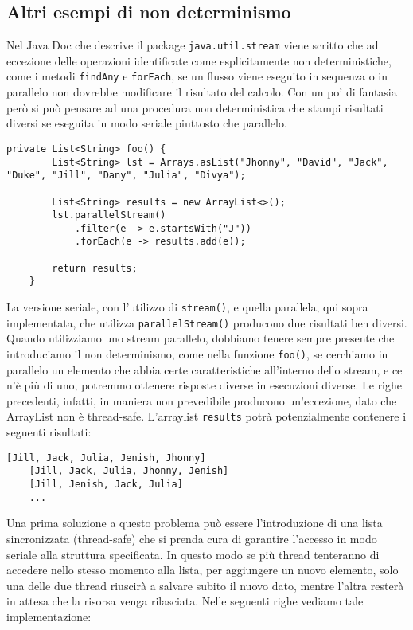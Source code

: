 						
		\subsection{Altri esempi di non determinismo}
		\label{esempi-non-det}
			Nel Java Doc che descrive il package \lstinline|java.util.stream| viene scritto che ad eccezione delle operazioni identificate come esplicitamente non deterministiche, come i metodi \lstinline|findAny| e \lstinline|forEach|, se un flusso viene eseguito in sequenza o in parallelo non dovrebbe modificare il risultato del calcolo. Con un po' di fantasia però si può pensare ad una procedura non deterministica che stampi risultati diversi se eseguita in modo seriale piuttosto che parallelo.
			\begin{lstlisting}[breaklines=true]
	private List<String> foo() {
		List<String> lst = Arrays.asList("Jhonny", "David", "Jack", "Duke", "Jill", "Dany", "Julia", "Divya");
	
		List<String> results = new ArrayList<>();
		lst.parallelStream()
			.filter(e -> e.startsWith("J"))
			.forEach(e -> results.add(e));
			
		return results;
	}
			\end{lstlisting}
			La versione seriale, con l'utilizzo di \lstinline|stream()|, e quella parallela, qui sopra implementata, che utilizza \lstinline|parallelStream()| producono due risultati ben diversi. Quando utilizziamo uno stream parallelo, dobbiamo tenere sempre presente che introduciamo il non determinismo, come nella funzione \lstinline|foo()|, se cerchiamo in parallelo un elemento che abbia certe caratteristiche all'interno dello stream, e ce n'è più di uno, potremmo ottenere risposte diverse in esecuzioni diverse. Le righe precedenti, infatti, in maniera non prevedibile producono un'eccezione, dato che ArrayList non è thread-safe. L'arraylist \lstinline|results| potrà potenzialmente contenere i seguenti risultati:
			\begin{lstlisting}[numbers=none,frame=none]
	[Jill, Jack, Julia, Jenish, Jhonny]
	[Jill, Jack, Julia, Jhonny, Jenish]
	[Jill, Jenish, Jack, Julia]
	...
			\end{lstlisting}
			Una prima soluzione a questo problema può essere l'introduzione di una lista sincronizzata (thread-safe) che si prenda cura di garantire l'accesso in modo seriale alla struttura specificata. In questo modo se più thread tenteranno di accedere nello stesso momento alla lista, per aggiungere un nuovo elemento, solo una delle due thread riuscirà a salvare subito il nuovo dato, mentre l'altra resterà in attesa che la risorsa venga rilasciata. Nelle seguenti righe vediamo tale implementazione:
